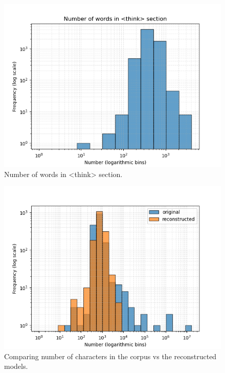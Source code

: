 \begin{figure}[htbp]
\centerline{\includegraphics[width=\linewidth]{"./Number of words in <think> section.png"}}
\caption{Number of words in <think> section.}
\label{fig}
\end{figure}


\begin{figure}[htbp]
\centerline{\includegraphics[width=\linewidth]{"./Comparing number of characters in the corpus vs the reconstructed models.png"}}
\caption{Comparing number of characters in the corpus vs the reconstructed models.}
\label{fig}
\end{figure}


